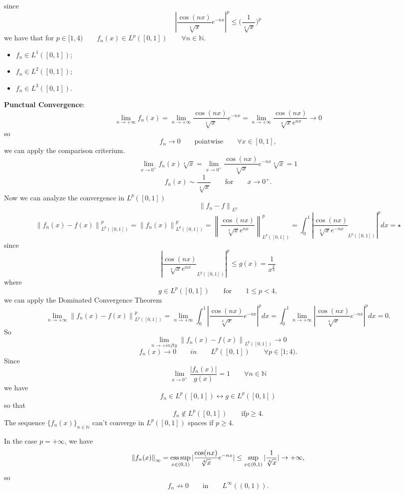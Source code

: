 \documentclass[a4paper, twoside, openany]{book}
\newcommand{\norm}[1]{\left\lVert#1\right\rVert}
\newcommand{\esssup}{\operatornamewithlimits{ess\,sup}}
\begin{document}
since
$$|\frac{\cos(nx)}{\sqrt[4]{x}} e^{-n x}|^p \leq \bigl( \frac{1}{\sqrt[4]{x}} \bigl)^p$$
we have that for $p \in [1, 4) \qquad f_n(x) \in L^p([0, 1]) \qquad \forall n \in \mathbb{N}.$
\begin{itemize}
\item $f_n \in L^1([0, 1])$;
\item $f_n \in L^2([0, 1])$;
\item $f_n \in L^3([0, 1])$.
\end{itemize}
\textbf{Punctual Convergence}:
$$\lim_{n \rightarrow +\infty} f_n(x) = \lim_{n \rightarrow +\infty} \frac{\cos(nx)}{\sqrt[4]{x}} e^{-nx} = \lim_{n \rightarrow +\infty} \frac{\cos(nx)}{\sqrt[4]{x} e^{nx}} \rightarrow 0$$
so
$$f_n \rightarrow 0 \qquad \textrm{pointwise} \qquad \forall x \in [0,1],$$
we can apply the comparison criterium.
$$\lim_{x \rightarrow 0^+} f_n(x) \sqrt[4]{x} = \lim_{x \rightarrow 0^+} \frac{\cos(nx)}{\sqrt[4]{x}}e^{-nx} \sqrt[4]{x} = 1$$
$$f_n(x) \sim \frac{1}{\sqrt[4]{x}} \qquad \textrm{for} \qquad x \rightarrow 0^+.$$
Now we can analyze the convergence in $L^p([0, 1])$
$$\norm{f_n - f}_{L^p}$$
$$\norm{f_n(x) - f(x)}_{L^p([0, 1])}^p = \norm{f_n(x)}_{L^p([0,1])}^p = \norm{\frac{\cos(nx)}{\sqrt[4]{x} e^{nx}}}_{L^p([0,1])}^p = \int_0^1 |\frac{\cos(nx)}{\sqrt[4]{x} e^{-nx}}_{L^p([0,1])}|^p dx = \star$$
since
$$|\frac{\cos(nx)}{\sqrt[4]{x} e^{nx}}_{L^p([0,1])}|^p \leq g(x) = \frac{1}{x^{\frac{p}{4}}}$$
where
$$g \in L^p([0,1]) \qquad \textrm{for} \qquad 1 \leq p < 4,$$
we can apply the Dominated Convergence Theorem
$$\lim_{n \rightarrow +\infty} \norm{f_n(x) - f(x)}_{L^p([0, 1])}^p = \lim_{n \rightarrow +\infty} \int_0^1 |\frac{\cos(nx)}{\sqrt[4]{x}}e^{-nx}|^p dx = \int_0^1 \lim_{n \rightarrow +\infty} |\frac{\cos(nx)}{\sqrt[4]{x}} e^{-nx}|^p dx = 0.$$	
So
$$\lim_{n \rightarrow +infty} \norm{f_n(x) - f(x)}_{L^p([0, 1])} \rightarrow 0$$
$$f_n(x) \rightarrow 0 \qquad in \qquad L^p([0, 1]) \qquad \forall p \in [1; 4).$$
Since
$$\lim_{x \rightarrow 0^+} \frac{|f_n(x)|}{g(x)} = 1 \qquad \forall n \in \mathbb{N}$$
we have
$$f_n \in L^p([0, 1]) \leftrightarrow g \in L^p([0, 1])$$
so that
$$f_n \notin L^p([0, 1]) \qquad \textrm{if} p \geq 4.$$
The sequence $\{ f_n(x) \}_{n \in \mathbb{N}}$ can't converge in $L^p([0, 1])$ spaces if $p \geq 4$. \par 
In the case $p = +\infty$, we have
$$\norm{f_n(x)}_{\infty} = \esssup_{x \in (0, 1)} |\frac{\cos(nx)}{\sqrt[4]{x}}e^{-nx}| \leq \sup_{x \in (0,1)} |\frac{1}{\sqrt[4]{x}}| \rightarrow +\infty,$$
so
$$f_n \nrightarrow 0 \qquad \textrm{in} \qquad L^{\infty}((0, 1)).$$		
\end{document}
